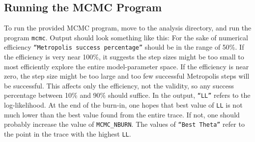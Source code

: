 \documentclass[UserManual.tex]{subfiles}
\begin{document}
\begin{sloppypar}
\subsection{Running the MCMC Program}\label{subsec:mcmcrunning}
To run the provided MCMC program, move to the analysis directory, and run the program {\tt mcmc}. Output should look something like this:
\vspace*{-8pt}
For the sake of numerical efficiency {\tt ``Metropolis success percentage''} should be in the range of 50\%. If the efficiency is very near 100\%, it suggests the step sizes might be too small to most efficiently explore the entire model-parameter space. If the efficiency is near zero, the step size might be too large and too few successful Metropolis steps will be successful. This affects only the efficiency, not the validity, so any success percentage between 10\% and 90\% should suffice. In the output, {\tt ``LL''} refers to the log-likelihood. At the end of the burn-in, one hopes that best value of {\tt LL} is not much lower than the best value found from the entire trace. If not, one should probably increase the value of {\tt MCMC\_NBURN}. The values of {\tt ``Best Theta''} refer to the point in the trace with the highest {\tt LL}. 


\end{sloppypar}
\end{document}
